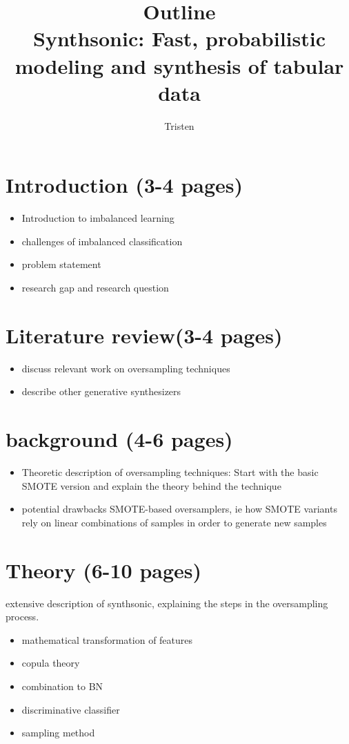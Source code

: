 \documentclass{article}
\author{Tristen}
\title{Outline \\ Synthsonic: Fast, probabilistic modeling and synthesis of tabular data}
\begin{document}
\maketitle

\section{Introduction (3-4 pages)}
    \begin{itemize}
        \item Introduction to imbalanced learning
        \item challenges of imbalanced classification
        \item problem statement
        \item research gap and research question
    \end{itemize}

\section{Literature review(3-4 pages)}
    \begin{itemize}
        \item discuss relevant work on oversampling techniques
        \item describe other generative synthesizers
    \end{itemize}


\section{background (4-6 pages)}
    \begin{itemize}
        \item Theoretic description of oversampling techniques: Start with the basic SMOTE version and explain the theory behind the technique
        \item potential drawbacks SMOTE-based oversamplers, ie how SMOTE variants rely on linear combinations of samples in order to generate new samples
    \end{itemize}

\section{Theory (6-10 pages)}
extensive description of synthsonic, explaining the steps in the oversampling process.
    \begin{itemize}
        \item mathematical transformation of features
        \item copula theory
        \item combination to BN
        \item discriminative classifier
        \item sampling method
    \end{itemize}
\end{document}
